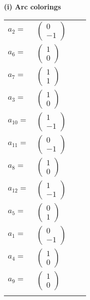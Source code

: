 \documentclass[1p]{elsarticle_modified}
\theoremstyle{definition}
\begin{document}
\flushleft \textbf{(i) Arc colorings}\\
\begin{tabular}{m{7pt} m{180pt} m{7pt} m{180pt} }
\flushright $a_{2}=$&$\begin{pmatrix}0\\-1\end{pmatrix}$ \\
\flushright $a_{6}=$&$\begin{pmatrix}1\\0\end{pmatrix}$ \\
\flushright $a_{7}=$&$\begin{pmatrix}1\\1\end{pmatrix}$ \\
\flushright $a_{3}=$&$\begin{pmatrix}1\\0\end{pmatrix}$ \\
\flushright $a_{10}=$&$\begin{pmatrix}1\\-1\end{pmatrix}$ \\
\flushright $a_{11}=$&$\begin{pmatrix}0\\-1\end{pmatrix}$ \\
\flushright $a_{8}=$&$\begin{pmatrix}1\\0\end{pmatrix}$ \\
\flushright $a_{12}=$&$\begin{pmatrix}1\\-1\end{pmatrix}$ \\
\flushright $a_{5}=$&$\begin{pmatrix}0\\1\end{pmatrix}$ \\
\flushright $a_{1}=$&$\begin{pmatrix}0\\-1\end{pmatrix}$ \\
\flushright $a_{4}=$&$\begin{pmatrix}1\\0\end{pmatrix}$ \\
\flushright $a_{9}=$&$\begin{pmatrix}1\\0\end{pmatrix}$\\&\end{tabular}
\end{document}
